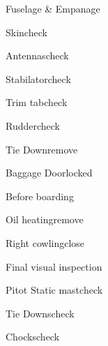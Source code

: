 \begin{multicols}{2}
\begin{checklist}{Fuselage \& Empanage}
  \item{Skin}{check}
  \item{Antennas}{check}
  \item{Stabilator}{check}
  \item{Trim tab}{check}
  \item{Rudder}{check}
  \item{Tie Down}{remove}
  \item{Baggage Door}{locked}
\end{checklist}

\begin{checklist}{Before boarding}
  \item{Oil heating}{remove}
  \item{Right cowling}{close}
  \item{Final visual inspection}{}
  \item{Pitot Static mast}{check}
  \item{Tie Downs}{check}
  \item{Chocks}{check}
\end{checklist}
\end{multicols}
